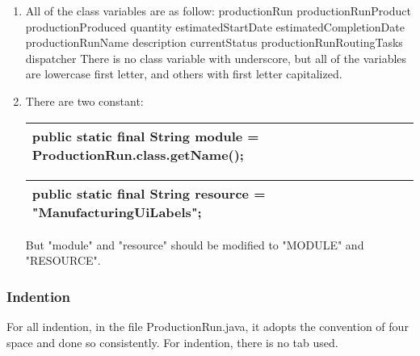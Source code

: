 \documentclass{article}
\begin{document}
\begin{enumerate}
  	\item
  	All of the class variables are as follow:\newline
  	productionRun\newline
  	productionRunProduct\newline
  	productionProduced\newline
  	quantity\newline
  	estimatedStartDate\newline
  	estimatedCompletionDate\newline
  	productionRunName\newline
  	description\newline
  	currentStatus\newline
  	productionRunRoutingTasks\newline
  	dispatcher\newline
  	There is no class variable with underscore, but all of the variables are lowercase first letter, and others with first letter capitalized.
  	
  	\item
  	There are two constant:\newline
  	\begin{table}[hpb]
  		\label{my-label}
  		\begin{tabular}{|l|}
  			\hline
  			public static final String module 
  			= ProductionRun.class.getName();\newline\\
  			\hline
  		\end{tabular}
  	\end{table} 
  	\begin{table}[hpb]
  		\label{my-label}
  		\begin{tabular}{|l|}
  			\hline
  			public static final String resource 
  			= "ManufacturingUiLabels";\newline\\
  			\hline
  		\end{tabular}
  	\end{table} 
  	But "module" and "resource" should be modified to "MODULE" and "RESOURCE".
  \end{enumerate}
  
  \subsubsection{Indention}
  For all indention, in the file ProductionRun.java, it adopts the convention of four space and done so consistently.\newline
  For indention, there is no tab used.
  
\end{document}
